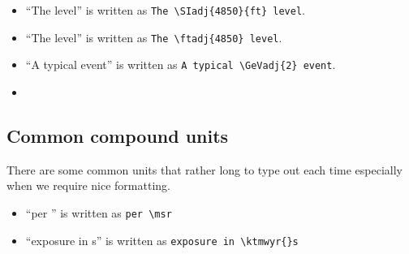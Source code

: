 \begin{itemize}
\item ``The  level'' is written as \verb|The \SIadj{4850}{ft} level|.
\item ``The  level'' is written as \verb|The \ftadj{4850} level|.
\item ``A typical  event'' is written as \verb|A typical \GeVadj{2} event|.
\item 
\end{itemize}

\subsection{Common compound units}

There are some common units that rather long to type out each time
especially when we require nice formatting.

\begin{itemize}
\item ``per \msr'' is written as \verb|per \msr|
\item ``exposure in \ktmwyr{}s'' is written as \verb|exposure in \ktmwyr{}s|
\end{itemize}

